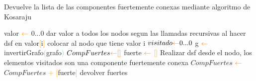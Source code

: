 \begin{algorithm}
\caption{Devuelve la lista de las componentes fuertemente conexas mediante algoritmo de Kosaraju}
\begin{algorithmic}[1]
\STATE valor $\textcolor{orange}{\leftarrow}$ {0...0}
\STATE dar valor a todos los nodos segun las llamadas recursivas al hacer dsf
\STATE en valor\textcolor{orange}{[}i\textcolor{orange}{]} colocar al nodo que tiene valor i
\STATE $visitado \textcolor{orange}{\leftarrow} {0...0}$
\STATE g $\textcolor{orange}{\leftarrow}$ invertirGrafo\textcolor{SkyBlue}{(}grafo\textcolor{SkyBlue}{)}
\STATE $CompFuertes \textcolor{orange}{\leftarrow} \textcolor{orange}{[}\textcolor{orange}{]}$
		\STATE fuerte $\textcolor{orange}{\leftarrow}$ \textcolor{orange}{[}\textcolor{orange}{]}
		\STATE Realizar dsf desde el nodo, los elementos visitados son una componente fuertemente conexa
		\STATE $CompFuertes$ $\textcolor{orange}{\leftarrow}$ $CompFuertes$ \textcolor{orange}{+} \textcolor{orange}{[}fuerte\textcolor{orange}{]}
\ENDFOR
\STATE devolver fuertes
\end{algorithmic}
\end{algorithm}

%	
%
%
